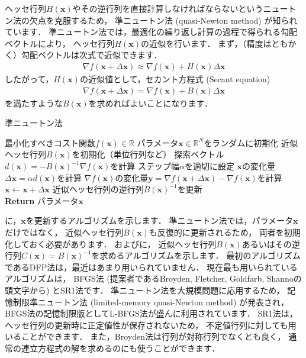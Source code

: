 ヘッセ行列$H(\bm{x})$やその逆行列を直接計算しなければならないというニュートン法の欠点を克服するため，
準ニュートン法 (quasi-Newton method) が知られています．
準ニュートン法では，最適化の繰り返し計算の過程で得られる勾配ベクトルにより，
ヘッセ行列$H(\bm{x})$の近似を行います．
まず，（精度はともかく）勾配ベクトルは次式で近似できます．
\begin{align}
 \nabla f(\bm{x} + \Delta\bm{x}) \approx \nabla f(\bm{x}) + H(\bm{x})\Delta\bm{x}
\end{align}
したがって，$H(\bm{x})$の近似値として，セカント方程式 (Secant equation)
\begin{align}
 \nabla f(\bm{x} + \Delta\bm{x}) = \nabla f(\bm{x}) + B(\bm{x})\Delta\bm{x}
\end{align}
を満たすような$B(\bm{x})$を求めればよいことになります．

\begin{algobox}{準ニュートン法}
\label{algo:quasi_newton}
\begin{algorithmic}[1]
\Require 最小化すべきコスト関数$f(\bm{x}) \in \mathbb{R}$
\State パラメータ$\bm{x} \in \mathbb{R}^N$をランダムに初期化
\State 近似ヘッセ行列$B(\bm{x})$を初期化（単位行列など）
\State 探索ベクトル$d(\bm{x}) = - B(\bm{x})^{-1} \nabla f(\bm{x})$を計算
\State ステップ幅$\alpha$を適切に設定
\State $\bm{x}$の変化量$\Delta\bm{x} = \alpha d(\bm{x})$を計算
\State $\nabla f(\bm{x})$の変化量$\bm{y} = \nabla f(\bm{x} + \Delta\bm{x}) - \nabla f(\bm{x})$を計算
\State $\bm{x} \gets \bm{x} + \Delta\bm{x}$
\State 近似ヘッセ行列の逆行列$B(\bm{x})^{-1}$を更新
\EndWhile\\
{\bf Return} パラメータ$\bm{x}$
\end{algorithmic}
\end{algobox}

に，$\bm{x}$を更新するアルゴリズムを示します．
準ニュートン法では，パラメータ$\bm{x}$だけではなく，
近似ヘッセ行列$B(\bm{x})$も反復的に更新されるため，
両者を初期化しておく必要があります．
およびに，
近似ヘッセ行列$B(\bm{x})$あるいはその逆行列$C(\bm{x}) = B(\bm{x})^{-1}$を求めるアルゴリズムを示します．
最初のアルゴリズムであるDFP法は，最近はあまり用いられていません．
現在最も用いられているアルゴリズムは，
BFGS法 (提案者であるBroyden, Fletcher, Goldfarb, Shannoの頭文字から) とSR1法です．
準ニュートン法を大規模問題に応用するため，
記憶制限準ニュートン法 (limited-memory quasi-Newton method) が発表され，
BFGS法の記憶制限版としてL-BFGS法が盛んに利用されています．
SR1法は，ヘッセ行列の更新時に正定値性が保存されないため，
不定値行列に対しても用いることができます．
また，Broyden法は行列が対称行列でなくとも良く，
通常の連立方程式の解を求めるのにも使うことができます．


